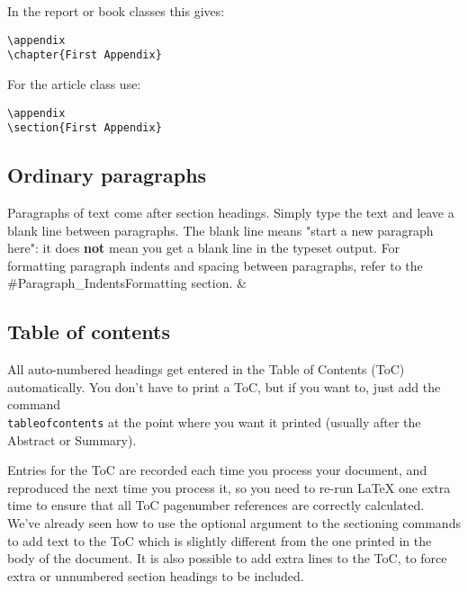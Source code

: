 In the report or book classes this gives:
\begin{lstlisting}
\appendix
\chapter{First Appendix}
\end{lstlisting}

For the article class use:
\begin{lstlisting}
\appendix
\section{First Appendix}
\end{lstlisting}

\subsection{ Ordinary paragraphs }
Paragraphs of text come after section headings. Simply type the text and leave
a blank line between paragraphs. The blank line means "start a new paragraph
here": it does \textbf{not} mean you get a blank line in the typeset output.
For formatting paragraph indents and spacing between paragraphs, refer to the
#Paragraph\_IndentsFormatting section. &

\subsection{ Table of contents }
All auto-numbered headings get entered in the Table of Contents (ToC)
automatically. You don't have to print a ToC, but if you want to, just add the
command \texttt{\\tableofcontents} at the point where you want it printed
(usually after the Abstract or Summary).

Entries for the ToC are recorded each time you process your document, and
reproduced the next time you process it, so you need to re-run LaTeX one extra
time to ensure that all ToC pagenumber references are correctly calculated.
We've already seen how to use the optional argument to the sectioning commands
to add text to the ToC which is slightly different from the one printed in the
body of the document. It is also possible to add extra lines to the ToC, to
force extra or unnumbered section headings to be included.

